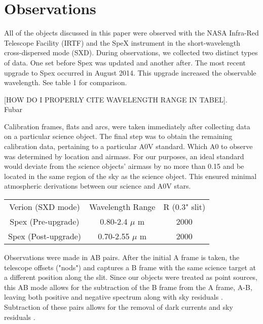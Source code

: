 \section{Observations}



All of the objects discussed in this paper were observed with the NASA Infra-Red Telescope Facility (IRTF) and the SpeX instrument \cite{Rayner_1998} in the short-wavelength cross-dispersed mode (SXD).  During observations, we collected two distinct types of data.  One set before Spex was updated and another after.  The most recent upgrade to Spex occurred in August 2014.  This upgrade increased the observable wavelength.  See table 1 for comparison.

[HOW DO I PROPERLY CITE WAVELENGTH RANGE IN TABEL]\cite{RAYER_SPEX_OBSERVING_MANUAL_or_Spextool_2015_manual}.\\

Fubar

Calibration frames, flats and arcs, were taken immediately after collecting data on a particular science object.  The final step was to obtain the remaining calibration data, pertaining to a particular A0V standard.  Which A0 to observe was determined by location and airmass.  For our purposes, an ideal standard would deviate from the science objects' airmass by no more than 0.15 and be located in the same region of the sky as the science object.  This ensured minimal atmospheric derivations between our science and A0V stars.

\begin{table}
\begin{tabular}{ccc}
Verion (SXD mode) & Wavelength Range & R (0.3" slit) \\
Spex (Pre-upgrade) & 0.80-2.4 $\mu$ m & 2000 \\
Spex (Post-upgrade) & 0.70-2.55 $\mu$ m & 2000 \\
\end{tabular}
\end{table}




Observations were made in AB pairs.  After the initial A frame is taken, the telescope offsets ("nods") and captures a B frame with the same science target at a different position along the slit.  Since our objects were treated as point sources, this AB mode allows for the subtraction of the B frame from the A frame, A-B, leaving both positive and negative spectrum along with sky residuals \cite{Cushing_2004}. Subtraction of these pairs allows for the removal of dark currents and sky residuals \cite{Joyce_1992}.\\


